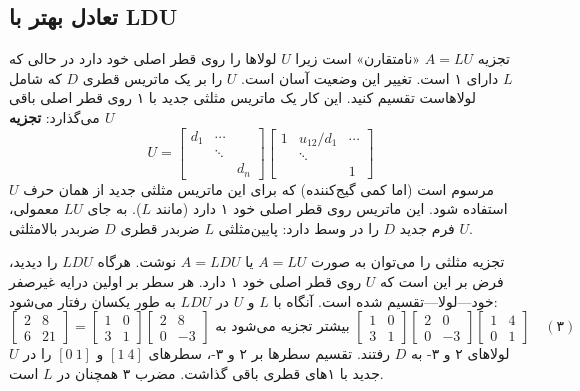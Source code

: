 \documentclass[12pt, a4paper]{book}
\begin{document}
	\subsection*{تعادل بهتر با LDU}
	تجزیه $A=LU$ «نامتقارن» است زیرا $U$ لولاها را روی قطر اصلی خود دارد در حالی که $L$ دارای ۱ است. تغییر این وضعیت آسان است. $U$ را بر یک ماتریس قطری $D$ که شامل لولاهاست تقسیم کنید. این کار یک ماتریس مثلثی جدید با ۱ روی قطر اصلی باقی می‌گذارد:
	\textbf{تجزیه $U$}
	\[ U = \begin{bmatrix} d_1 & \cdots \\ & \ddots \\ & & d_n \end{bmatrix} \begin{bmatrix} 1 & u_{12}/d_1 & \cdots \\ & \ddots & \\ & & 1 \end{bmatrix} \]
	مرسوم است (اما کمی گیج‌کننده) که برای این ماتریس مثلثی جدید از همان حرف $U$ استفاده شود. این ماتریس روی قطر اصلی خود ۱ دارد (مانند $L$). به جای $LU$ معمولی، فرم جدید $D$ را در وسط دارد: پایین‌مثلثی $L$ ضربدر قطری $D$ ضربدر بالامثلثی $U$.
	
	تجزیه مثلثی را می‌توان به صورت $A=LU$ یا $A=LDU$ نوشت. هرگاه $LDU$ را دیدید، فرض بر این است که $U$ روی قطر اصلی خود ۱ دارد. هر سطر بر اولین درایه غیرصفر خود—لولا—تقسیم شده است. آنگاه با $L$ و $U$ در $LDU$ به طور یکسان رفتار می‌شود:
	\[ \begin{bmatrix} 2 & 8 \\ 6 & 21 \end{bmatrix} = \begin{bmatrix} 1 & 0 \\ 3 & 1 \end{bmatrix} \begin{bmatrix} 2 & 8 \\ 0 & -3 \end{bmatrix} \text{ بیشتر تجزیه می‌شود به } \begin{bmatrix} 1 & 0 \\ 3 & 1 \end{bmatrix} \begin{bmatrix} 2 & 0 \\ 0 & -3 \end{bmatrix} \begin{bmatrix} 1 & 4 \\ 0 & 1 \end{bmatrix} \quad (۳) \]
	لولاهای ۲ و ۳- به $D$ رفتند. تقسیم سطرها بر ۲ و ۳-، سطرهای $[1 \ 4]$ و $[0 \ 1]$ را در $U$ جدید با ۱‌های قطری باقی گذاشت. مضرب ۳ همچنان در $L$ است.
	
\end{document}
